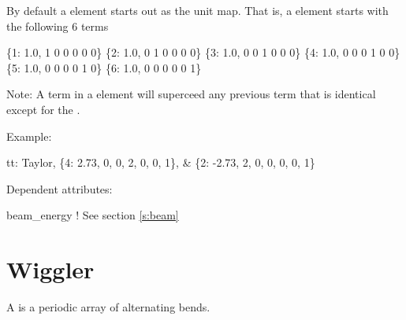 By default a  element starts out as the unit map. 
That is, a  element starts with the following 6 terms
\begin{example}
  \{1: 1.0, 1 0 0 0 0 0\}
  \{2: 1.0, 0 1 0 0 0 0\}
  \{3: 1.0, 0 0 1 0 0 0\}
  \{4: 1.0, 0 0 0 1 0 0\}
  \{5: 1.0, 0 0 0 0 1 0\}
  \{6: 1.0, 0 0 0 0 0 1\}
\end{example}
Note: A term in a  element will superceed any previous term
that is identical except for 
the .

 \noindent
Example:
\begin{example}
  tt: Taylor, \{4:  2.73, 0, 0, 2, 0, 0, 1\}, &
              \{2: -2.73, 2, 0, 0, 0, 0, 1\}
\end{example}

\vskip0.05in \noindent
Dependent attributes:
\begin{example}
  beam\_energy  ! See section \ref{s:beam}
\end{example}

\section{Wiggler} 
\label{s:wig}

A  is a periodic array of alternating bends.

